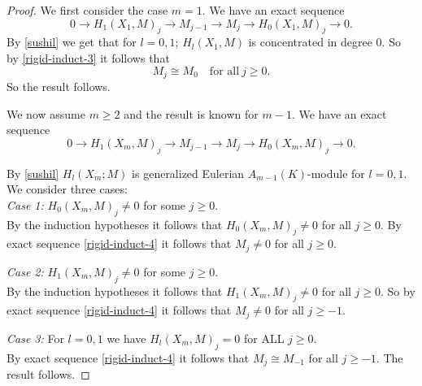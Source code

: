\documentclass{amsart}
\newcommand{\rt}{\rightarrow}
\theoremstyle{plain}
\theoremstyle{definition}
\theoremstyle{remark}
\begin{document}
\begin{proof}
We first consider the case $m = 1$.
 We have an exact sequence
 \begin{equation}
  \label{rigid-induct-3}
  0 \rt H_1(X_1, M)_j \rt M_{j-1} \rt M_j \rt H_0(X_1, M)_j \rt 0.
 \end{equation}
By \ref{sushil} we get that for $l = 0, 1$; $H_l(X_1, M)$ is concentrated in degree $0$.
So by \ref{rigid-induct-3} it follows that 
\[
 M_j \cong M_{0} \quad \text{for all} \ j \geq 0.
\]
So the result follows.

We now assume $m \geq 2$ and the result is known for $m-1$. We have an exact sequence
 \begin{equation}
  \label{rigid-induct-4}
  0 \rt H_1(X_m, M)_j \rt M_{j-1} \rt M_j \rt H_0(X_m, M)_j \rt 0.
 \end{equation}

By \ref{sushil} $H_l(X_m; M)$ is generalized Eulerian $A_{m-1}(K)$-module for $l = 0,1$. We consider three cases:\\
\textit{Case 1:} $H_0(X_m, M)_j \neq 0$ for some $j \geq 0$. \\
By the induction hypotheses it follows that $H_0(X_m, M)_j \neq 0$ for all $j \geq 0$.
 By exact sequence \ref{rigid-induct-4} it follows that $M_j \neq 0$
for all $j \geq 0$.

\textit{Case 2:} $H_1(X_m, M)_j \neq 0$ for some $j \geq 0$. \\
By the induction hypotheses it follows that $H_1(X_m, M)_j \neq 0$ for all $j \geq  0$. So
by exact sequence \ref{rigid-induct-4} it follows that $M_j \neq 0$
for all $j \geq -1$.

\textit{Case 3:} For $l = 0,1$ we have  $H_l(X_m, M)_j = 0$ for ALL $j \geq 0$. \\
By exact sequence \ref{rigid-induct-4} it follows that
$M_j \cong M_{-1}$ for all $j \geq -1$. The result follows.
\end{proof}
 
\end{document}
